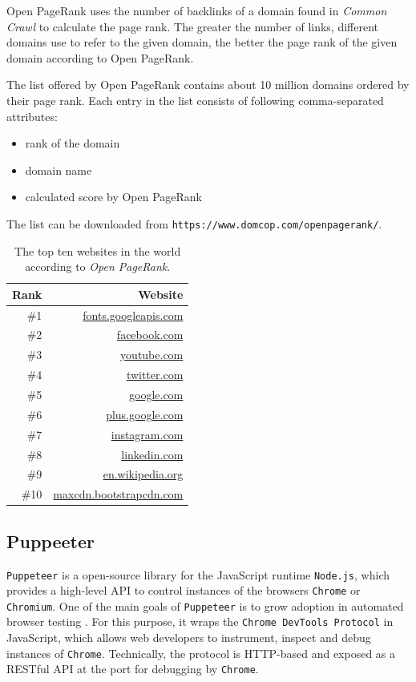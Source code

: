 Open PageRank uses the number of backlinks of a domain found in \textit{Common Crawl} to calculate the page rank. The greater the number of links, different domains use to refer to the given domain, the better the page rank of the given domain according to Open PageRank.

The list offered by Open PageRank contains about 10 million domains ordered by their page rank. Each entry in the list consists of following comma-separated attributes:

\begin{itemize}
	\item rank of the domain
	\item domain name
	\item calculated score by Open PageRank
\end{itemize}

The list can be downloaded from \texttt{https://www.domcop.com/openpagerank/}.

\begin{table}
	\center
	\begin{tabular}{r|r}
		\textbf{Rank} & Website  \\ \hline \hline
		\#1 & \url{fonts.googleapis.com} \\ \hline
		\#2 & \url{facebook.com} \\ \hline
		\#3 & \url{youtube.com} \\ \hline
		\#4 & \url{twitter.com} \\ \hline
		\#5 & \url{google.com} \\ \hline
		\#6 & \url{plus.google.com} \\ \hline
		\#7 & \url{instagram.com} \\ \hline
		\#8 & \url{linkedin.com}\\ \hline
		\#9 & \url{en.wikipedia.org}\\ \hline
		\#10 & \url{maxcdn.bootstrapcdn.com}\\
	\end{tabular}
	\caption[List of top ten websites from \textit{Open PageRank}]{The top ten websites in the world according to \textit{Open PageRank}.}
	\label{tab:toptensites}
\end{table}


\subsection{Puppeeter}
\label{puppeeter}
\texttt{Puppeteer} is a open-source library for the JavaScript runtime \texttt{Node.js}, which provides a high-level API to control instances of the browsers \texttt{Chrome} or \texttt{Chromium}. One of the main goals of \texttt{Puppeteer} is to grow adoption in automated browser testing \cite{PuppeteerFAQ}.  For this purpose, it wraps the \texttt{Chrome DevTools Protocol} in JavaScript, which allows web developers to instrument, inspect and debug instances of \texttt{Chrome}. Technically, the protocol is HTTP-based and exposed as a RESTful API at the port for debugging by \texttt{Chrome}.

